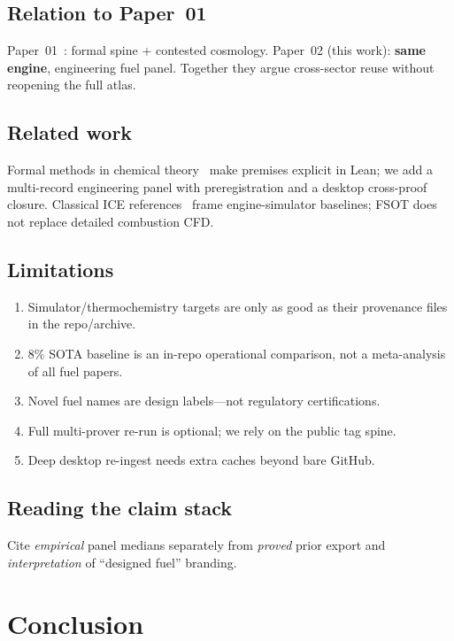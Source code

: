 \documentclass[11pt,a4paper]{article}
\begin{document}
\subsection{Relation to Paper~01}

Paper~01~\cite{FSOTPaper01}: formal spine + contested cosmology.
Paper~02 (this work): \textbf{same engine}, engineering fuel panel.
Together they argue cross-sector reuse without reopening the full atlas.

\subsection{Related work}

Formal methods in chemical theory~\cite{Bobbin2024} make premises explicit in
Lean; we add a multi-record engineering panel with preregistration and a
desktop cross-proof closure.
Classical ICE references~\cite{HeywoodICE} frame engine-simulator baselines;
FSOT does not replace detailed combustion CFD.

\subsection{Limitations}

\begin{enumerate}[leftmargin=*]
\item Simulator/thermochemistry targets are only as good as their provenance
      files in the repo/archive.
\item $8\%$ SOTA baseline is an in-repo operational comparison, not a
      meta-analysis of all fuel papers.
\item Novel fuel names are design labels---not regulatory certifications.
\item Full multi-prover re-run is optional; we rely on the public tag spine.
\item Deep desktop re-ingest needs extra caches beyond bare GitHub.
\end{enumerate}

\subsection{Reading the claim stack}

Cite \emph{empirical} panel medians separately from \emph{proved} prior export
and \emph{interpretation} of ``designed fuel'' branding.

\section{Conclusion}
\label{sec:conc}
\end{document}
